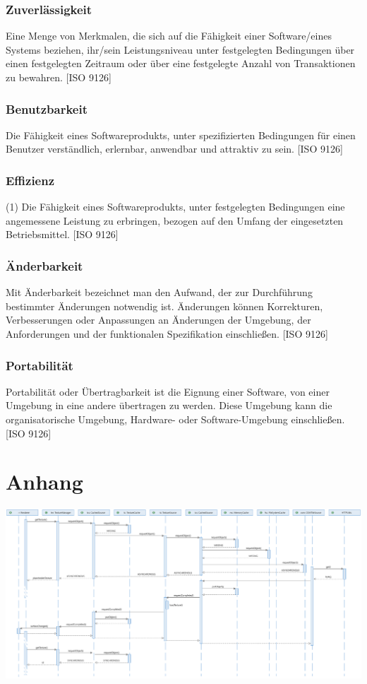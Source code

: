 \documentclass[10pt]{scrreprt}
\begin{document}
\subsection*{Zuverlässigkeit}
Eine Menge von Merkmalen, die sich auf die Fähigkeit einer Software/eines Systems beziehen, ihr/sein Leistungsniveau unter festgelegten Bedingungen über einen festgelegten Zeitraum oder über eine festgelegte Anzahl von Transaktionen zu bewahren. [ISO 9126]

\subsection*{Benutzbarkeit}
Die Fähigkeit eines Softwareprodukts, unter spezifizierten Bedingungen für einen Benutzer verständlich, erlernbar, anwendbar und attraktiv zu sein. [ISO 9126]

\subsection*{Effizienz}
(1) Die Fähigkeit eines Softwareprodukts, unter festgelegten Bedingungen eine angemessene Leistung zu erbringen, bezogen auf den Umfang der eingesetzten Betriebsmittel. [ISO 9126]

\subsection*{Änderbarkeit}
Mit Änderbarkeit bezeichnet man den Aufwand, der zur Durchführung bestimmter Änderungen notwendig ist. Änderungen können Korrekturen, Verbesserungen oder Anpassungen an Änderungen der Umgebung, der Anforderungen und der funktionalen Spezifikation einschließen. [ISO 9126]

\subsection*{Portabilität}
Portabilität oder Übertragbarkeit ist die Eignung einer Software, von einer Umgebung in eine andere übertragen zu werden. Diese Umgebung kann die organisatorische Umgebung, Hardware- oder Software-Umgebung einschließen. [ISO 9126]



\chapter*{Anhang}
\pagebreak
{}
\thispagestyle{empty}
\begin{centering}
\includegraphics[scale=0.46,angle=90,origin=c]{sequenz-osmtile.eps}
\end{centering}
\restoregeometry
\end{document}
